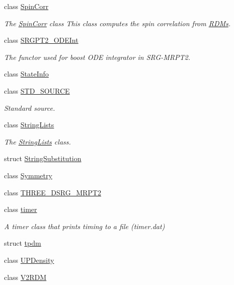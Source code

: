 \begin{DoxyCompactItemize}
class \mbox{\hyperlink{classforte_1_1_spin_corr}{Spin\+Corr}}
\begin{DoxyCompactList}\small\item\em The \mbox{\hyperlink{classforte_1_1_spin_corr}{Spin\+Corr}} class This class computes the spin correlation from \mbox{\hyperlink{classforte_1_1_r_d_ms}{R\+D\+Ms}}. \end{DoxyCompactList}\item 
class \mbox{\hyperlink{classforte_1_1_s_r_g_p_t2___o_d_e_int}{S\+R\+G\+P\+T2\+\_\+\+O\+D\+E\+Int}}
\begin{DoxyCompactList}\small\item\em The functor used for boost O\+DE integrator in S\+R\+G-\/\+M\+R\+P\+T2. \end{DoxyCompactList}\item 
class \mbox{\hyperlink{classforte_1_1_state_info}{State\+Info}}
\item 
class \mbox{\hyperlink{classforte_1_1_s_t_d___s_o_u_r_c_e}{S\+T\+D\+\_\+\+S\+O\+U\+R\+CE}}
\begin{DoxyCompactList}\small\item\em Standard source. \end{DoxyCompactList}\item 
class \mbox{\hyperlink{classforte_1_1_string_lists}{String\+Lists}}
\begin{DoxyCompactList}\small\item\em The \mbox{\hyperlink{classforte_1_1_string_lists}{String\+Lists}} class. \end{DoxyCompactList}\item 
struct \mbox{\hyperlink{structforte_1_1_string_substitution}{String\+Substitution}}
\item 
class \mbox{\hyperlink{classforte_1_1_symmetry}{Symmetry}}
\item 
class \mbox{\hyperlink{classforte_1_1_t_h_r_e_e___d_s_r_g___m_r_p_t2}{T\+H\+R\+E\+E\+\_\+\+D\+S\+R\+G\+\_\+\+M\+R\+P\+T2}}
\item 
class \mbox{\hyperlink{classforte_1_1timer}{timer}}
\begin{DoxyCompactList}\small\item\em A timer class that prints timing to a file (timer.\+dat) \end{DoxyCompactList}\item 
struct \mbox{\hyperlink{structforte_1_1tpdm}{tpdm}}
\item 
class \mbox{\hyperlink{classforte_1_1_u_p_density}{U\+P\+Density}}
\item 
class \mbox{\hyperlink{classforte_1_1_v2_r_d_m}{V2\+R\+DM}}
\end{DoxyCompactItemize}
